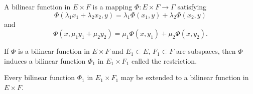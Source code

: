 A bilinear function in $E \times F$ is a mapping $\Phi: E \times F \rightarrow \Gamma$ satisfying
$$\Phi(\lambda_1 x_1 + \lambda_2 x_2, y) = \lambda_1 \Phi(x_1, y) + \lambda_2 \Phi(x_2, y)$$
and
$$\Phi(x, \mu_1 y_1 + \mu_2 y_2) = \mu_1 \Phi(x, y_1) + \mu_2 \Phi(x, y_2).$$

If $\Phi$ is a bilinear function in $E \times F$ and $E_1 \subset E$, $F_1 \subset F$ are subspaces, then $\Phi$ induces a bilinear function $\Phi_1$ in $E_1 \times F_1$ called the restriction.

Every bilinear function $\Phi_1$ in $E_1 \times F_1$ may be extended to a bilinear function in $E \times F$.

